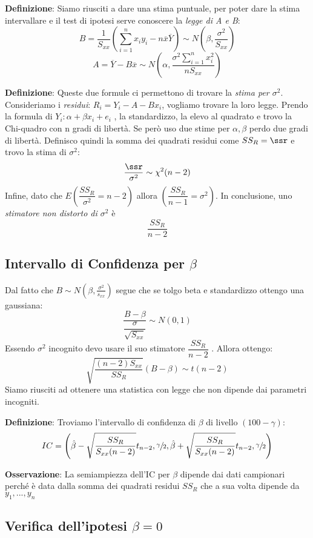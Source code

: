 \ind \textbf{Definizione}: Siamo riusciti a dare una stima puntuale, per poter dare la stima intervallare e il test di ipotesi serve conoscere la \textit{legge di A e B}:$$B = \dfrac{1}{S_{xx}} \left( \sum_{i=1}^n x_iy_i - n \overline{x}\overline{Y} \right) \sim N \left(\beta, \dfrac{\sigma^2}{S_{xx}} \right)$$ $$A = \overline{Y} - B\overline{x} \sim N \left( \alpha, \dfrac{\sigma^2 \sum_{i=1}^n x_i^2}{n S_{xx}} \right)$$

\ind \textbf{Definizione}: Queste due formule ci permettono di trovare la \textit{stima per $\sigma^2$}. Consideriamo i \textit{residui}: $R_i = Y_i - A - Bx_i$, vogliamo trovare la loro legge. Prendo la formula di $Y_i : \alpha + \beta x_i + e_i$ , la standardizzo, la elevo al quadrato e trovo la Chi-quadro con n gradi di libertà. Se però uso due stime per $\alpha, \beta$ perdo due gradi di libertà. Definisco quindi la somma dei quadrati residui come $SS_R=\ssr$ e trovo la stima di $\sigma^2$: $$\dfrac{\ssr}{\sigma^2} \sim \chi^2(n-2)$$ Infine, dato che $E \left( \dfrac{SS_R}{\sigma^2} = n-2 \right)$ allora $ \left( \dfrac{SS_R}{n-1} = \sigma^2 \right)$. In conclusione, uno \textit{stimatore non distorto di $\sigma^2$} è $$\dfrac{SS_R}{n-2}$$

\subsection{Intervallo di Confidenza per $\beta$}

Dal fatto che $B \sim N(\beta, \frac{\sigma^2}{s_{xx}})$ segue che se tolgo beta e standardizzo ottengo una gaussiana: $$\dfrac{B - \beta}{\dfrac{\sigma}{\sqrt{S_{xx}}}} \sim N(0,1)$$ Essendo $\sigma^2$ incognito devo usare il suo stimatore $\dfrac{SS_R}{n-2}$ . Allora ottengo: $$\sqrt{\dfrac{(n-2)S_{xx}}{SS_R}} (B - \beta) \sim t(n-2)$$ Siamo riusciti ad ottenere una statistica con legge che non dipende dai parametri incogniti. \n

\ind \textbf{Definizione}: Troviamo l'intervallo di confidenza di $\beta$ di livello $(100 - \gamma)$: $$IC = \left( \hat{\beta} - \sqrt{\dfrac{SS_R}{S_{xx}(n-2)}}t_{n-2},\sfrac{\gamma}{2}, \hat{\beta} + \sqrt{\dfrac{SS_R}{S_{xx}(n-2)}}t_{n-2},\sfrac{\gamma}{2} \right) $$

\ind \textbf{Osservazione}: La semiampiezza dell'IC per $\beta$ dipende dai dati campionari perché è data dalla somma dei quadrati residui $SS_R$ che a sua volta dipende da $y_1, ..., y_n$ \n

\subsection{Verifica dell'ipotesi $\beta=0$}


